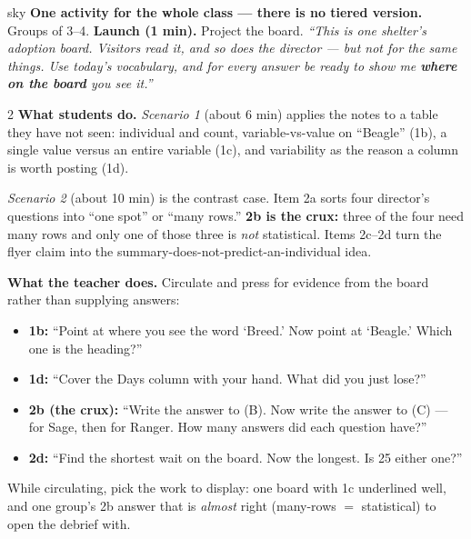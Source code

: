 \documentclass[10pt]{article}
\begin{document}
\boxguard
\begin{skillbox}{sky}
\textbf{One activity for the whole class --- there is no tiered version.} Groups of 3--4.
\textbf{Launch (1 min).} Project the board. \emph{``This is one shelter's adoption board.
Visitors read it, and so does the director --- but not for the same things. Use today's
vocabulary, and for every answer be ready to show me \textbf{where on the board} you see it.''}

\begin{multicols}{2}
\textbf{What students do.} \emph{Scenario 1} (about 6 min) applies the notes to a table they
have not seen: individual and count, variable-vs-value on ``Beagle'' (1b), a single value versus
an entire variable (1c), and variability as the reason a column is worth posting (1d).

\emph{Scenario 2} (about 10 min) is the contrast case. Item 2a sorts four director's questions
into ``one spot'' or ``many rows.'' \textbf{2b is the crux:} three of the four need many rows and
only one of those three is \emph{not} statistical. Items 2c--2d turn the flyer claim into the
summary-does-not-predict-an-individual idea.

\columnbreak
\textbf{What the teacher does.} Circulate and press for evidence from the board rather than
supplying answers:
\begin{itemize}[leftmargin=1.1em, nosep]
  \item \textbf{1b:} ``Point at where you see the word `Breed.' Now point at `Beagle.' Which one
        is the heading?''
  \item \textbf{1d:} ``Cover the Days column with your hand. What did you just lose?''
  \item \textbf{2b (the crux):} ``Write the answer to (B). Now write the answer to (C) --- for
        Sage, then for Ranger. How many answers did each question have?''
  \item \textbf{2d:} ``Find the shortest wait on the board. Now the longest. Is 25 either one?''
\end{itemize}
While circulating, pick the work to display: one board with 1c underlined well, and one group's
2b answer that is \emph{almost} right (many-rows $=$ statistical) to open the debrief with.
\end{multicols}
\end{skillbox}
\end{document}
